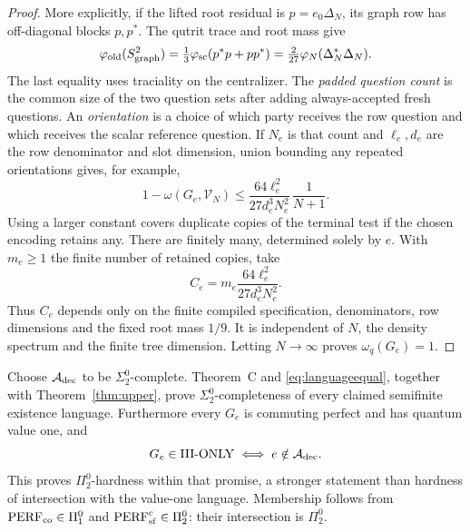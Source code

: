 \begin{proof}
More explicitly, if the lifted root residual is $p=e_0\Delta_N$, its
graph row has off-diagonal blocks $p,p^*$. The qutrit trace and
root mass give
\[
 \varphi_{\rm old}(S_{\rm graph}^2)
 =\tfrac13\varphi_{\rm sc}(p^*p+pp^*)
 =\tfrac{2}{27}\varphi_N(\Delta_N^*\Delta_N).
\]
The last equality uses traciality on the centralizer.
The \emph{padded question count} is the common size of the two
question sets after adding always-accepted fresh questions.
An \emph{orientation} is a choice of which party receives the
row question and which receives the scalar reference question.
If $N_e$ is that count and $\ell_e,d_e$ are the row
denominator and slot dimension, union bounding any repeated
orientations gives, for example,
\[
 1-\omega(G_e,\mathcal V_N)
 \leq \frac{64\ell_e^2}{27d_e^3N_e^2}\,\frac1{N+1}.
\]
Using a larger constant covers duplicate copies of the terminal test
if the chosen encoding retains any. There are finitely many,
determined solely by $e$.
With $m_e\geq1$ the finite number of retained copies, take
\[
 C_e=m_e\frac{64\ell_e^2}{27d_e^3N_e^2}.
\]
Thus $C_e$ depends only on the finite compiled specification,
denominators, row dimensions and the fixed root mass $1/9$.
It is independent of $N$, the density spectrum and the finite tree
dimension. Letting $N\to\infty$ proves $\omega_q(G_e)=1$.
\end{proof}

Choose $\mathcal A_{\rm dec}$ to be $\Sigma^0_2$-complete.
Theorem~C and \eqref{eq:languageequal}, together with
Theorem~\ref{thm:upper}, prove $\Sigma^0_2$-completeness of every
claimed semifinite existence language.
Furthermore every $G_e$ is commuting perfect and has quantum value one,
and
\[
 G_e\in\mathrm{III}\text{-}\mathrm{ONLY}\iff e\notin\mathcal A_{\rm dec}.
\]
This proves $\Pi^0_2$-hardness within that promise, a stronger statement
than hardness of intersection with the value-one language.
Membership follows from
$\mathrm{PERF}_{\mathrm{co}}\in\Pi^0_1$ and
$\mathrm{PERF}_{\mathrm{sf}}^c\in\Pi^0_2$:
their intersection is $\Pi^0_2$.
